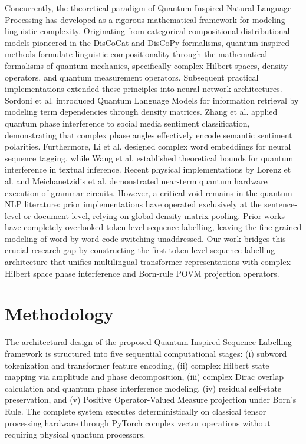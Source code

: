 \documentclass[10pt,twocolumn,letterpaper]{article}
\theoremstyle{definition}
\begin{document}
Concurrently, the theoretical paradigm of Quantum-Inspired Natural Language Processing has developed as a rigorous mathematical framework for modeling linguistic complexity. Originating from categorical compositional distributional models pioneered in the DisCoCat and DisCoPy formalisms, quantum-inspired methods formulate linguistic compositionality through the mathematical formalisms of quantum mechanics, specifically complex Hilbert spaces, density operators, and quantum measurement operators. Subsequent practical implementations extended these principles into neural network architectures. Sordoni et al. introduced Quantum Language Models for information retrieval by modeling term dependencies through density matrices. Zhang et al. applied quantum phase interference to social media sentiment classification, demonstrating that complex phase angles effectively encode semantic sentiment polarities. Furthermore, Li et al. designed complex word embeddings for neural sequence tagging, while Wang et al. established theoretical bounds for quantum interference in textual inference. Recent physical implementations by Lorenz et al. and Meichanetzidis et al. demonstrated near-term quantum hardware execution of grammar circuits. However, a critical void remains in the quantum NLP literature: prior implementations have operated exclusively at the sentence-level or document-level, relying on global density matrix pooling. Prior works have completely overlooked token-level sequence labelling, leaving the fine-grained modeling of word-by-word code-switching unaddressed. Our work bridges this crucial research gap by constructing the first token-level sequence labelling architecture that unifies multilingual transformer representations with complex Hilbert space phase interference and Born-rule POVM projection operators.

\section{Methodology}
The architectural design of the proposed Quantum-Inspired Sequence Labelling framework is structured into five sequential computational stages: (i) subword tokenization and transformer feature encoding, (ii) complex Hilbert state mapping via amplitude and phase decomposition, (iii) complex Dirac overlap calculation and quantum phase interference modeling, (iv) residual self-state preservation, and (v) Positive Operator-Valued Measure projection under Born's Rule. The complete system executes deterministically on classical tensor processing hardware through PyTorch complex vector operations without requiring physical quantum processors.
\end{document}
